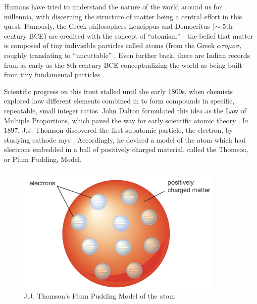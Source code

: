 Humans have tried to understand the nature of the world around us for millennia, with discerning the structure of matter being a central effort in this quest. Famously, the Greek philosophers Leucippus and Democritus ($\sim$ 5th century BCE) are credited with the concept of ``atomism'' - the belief that matter is composed of tiny indivisible particles called atoms (from the Greek $\alpha \tau o \mu o \sigma$, roughly translating to ``uncuttable'' \parencite{C.C.W.Taylor1999Commentary}. Even further back, there are Indian records from as early as the 8th century BCE conceptualizing the world as being built from tiny fundamental particles \parencite{ThomasMcEvilley2002THePhilosophies}.

Scientific progress on this front stalled until the early 1800s, when chemists explored how different elements combined in to form compounds in specific, repeatable, small integer ratios. John Dalton formulated this idea as the Law of Multiple Proportions, which paved the way for early scientific atomic theory \parencite{Britannica2010LawProportions}. In 1897, J.J. Thomson discovered the first subatomic particle, the electron, by studying cathode rays \parencite{Thomson1901OnAtoms}. Accordingly, he devised a model of the atom which had electrons embedded in a ball of positively charged material, called the Thomson, or Plum Pudding, Model\parencite{JaumeNavarro1995AThomson}.

\begin{figure}
    \centering
    \includegraphics[width=0.9\textwidth]{Chapters/Ch1-Intro/Ch1-Sec1-Background/pics/plumbpudding.png}
    \caption[J.J. Thomson's Plum Pudding Model]{J.J. Thomson's Plum Pudding Model of the atom \parencite{Britannica2023ThomsonModel} }
    \label{fig:PlumPudding}
\end{figure}

